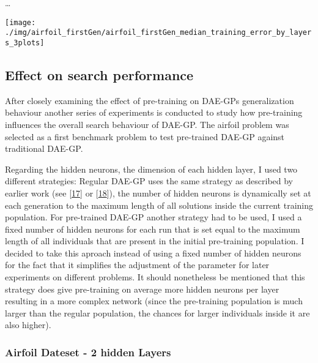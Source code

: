 \documentclass[
  11pt,
]{article}
\let\origfigure\figure
\let\endorigfigure\endfigure
\renewenvironment{figure}[1][2] {
    \expandafter\origfigure\expandafter[H]
} {
    \endorigfigure
}
\begin{document}
\ldots{}

\begin{figure}[c]

{\centering \texttt{[image: ./img/airfoil\_firstGen/airfoil\_firstGen\_median\_training\_error\_by\_layers\_3plots]} 

}

\caption{First Generation Median Training Error for variable number of hidden Layers}\label{fig:first-gen-airfoil-byLayers}
\end{figure}

\hypertarget{effect-on-search-performance}{%
\subsection{Effect on search performance}\label{effect-on-search-performance}}

After closely examining the effect of pre-training on DAE-GPs generalization behaviour another series of experiments is conducted to study how pre-training influences the overall search behaviour of DAE-GP. The airfoil problem was selected as a first benchmark problem to test pre-trained DAE-GP against traditional DAE-GP.

Regarding the hidden neurons, the dimension of each hidden layer, I used two different strategies: Regular DAE-GP uses the same strategy as described by earlier work (see {[}\protect\hyperlink{ref-dae-gp_2022_symreg}{17}{]} or {[}\protect\hyperlink{ref-dae-gp_2020_rtree}{18}{]}), the number of hidden neurons is dynamically set at each generation to the maximum length of all solutions inside the current training population. For pre-trained DAE-GP another strategy had to be used, I used a fixed number of hidden neurons for each run that is set equal to the maximum length of all individuals that are present in the initial pre-training population. I decided to take this aproach instead of using a fixed number of hidden neurons for the fact that it simplifies the adjustment of the parameter for later experiments on different problems. It should nonetheless be mentioned that this strategy does give pre-training on average more hidden neurons per layer resulting in a more complex network (since the pre-training population is much larger than the regular population, the chances for larger individuals inside it are also higher).

\hypertarget{airfoil-dateset---2-hidden-layers}{%
\subsubsection{Airfoil Dateset - 2 hidden Layers}\label{airfoil-dateset---2-hidden-layers}}
\end{document}
